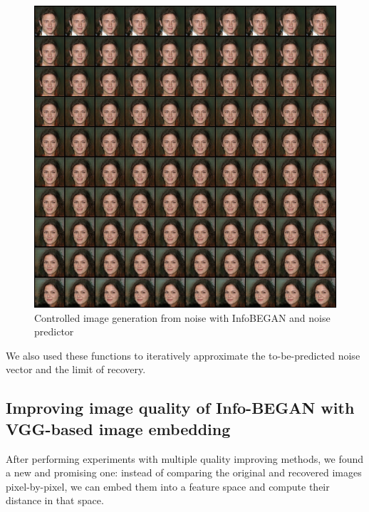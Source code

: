 \documentclass{egpubl}
\begin{document}
\begin{figure}[!htb]
	\centering
	\includegraphics[width=1\linewidth]{pic/InfoBegan_varied_result}
	\caption{Controlled image generation from noise with InfoBEGAN and noise predictor}
	
\end{figure}

We also used these functions to iteratively approximate the to-be-predicted noise vector and the limit of recovery.

\subsection{Improving image quality of Info-BEGAN with VGG-based image embedding}

After performing experiments %
with multiple quality improving methods, %
we found a new and promising one: instead of comparing the original and recovered images pixel-by-pixel, %
we can embed them into a feature space and compute their distance in that space.
\\
\end{document}
